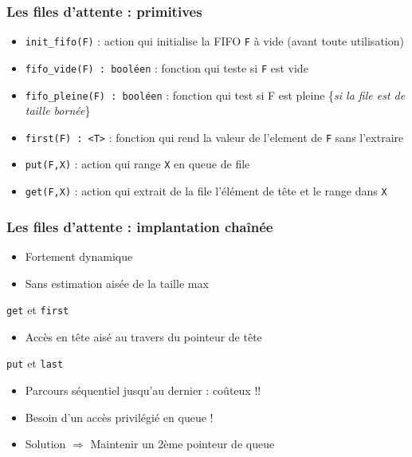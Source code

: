 \documentclass[table,handout,tikz,12pt,svgnames]{beamer}
\begin{document}
\begin{frame}[fragile=singleslide]
	\frametitle{Les files d'attente : primitives}
	\begin{block}{}
		\begin{itemize}
			\item \texttt{init\_fifo(F)} : action qui initialise la FIFO \texttt{F} à vide (avant toute utilisation)
			\item \texttt{fifo\_vide(F) : booléen} : fonction qui teste si \texttt{F} est vide
			\item \texttt{fifo\_pleine(F) : booléen} : fonction qui test si F est pleine \{\textit{si la file est de taille bornée}\}
			\item \texttt{first(F) : <T>} : fonction qui rend la valeur de l'element de \texttt{F} sans l'extraire
			\item \texttt{put(F,X)} : action qui range \texttt{X} en queue de file
			\item \texttt{get(F,X)} : action qui extrait de la file l'élément de tête et le range dans \texttt{X}
		\end{itemize}
	\end{block}
\end{frame}


\begin{frame}[fragile=singleslide]
	\frametitle{Les files d'attente : implantation chaînée}
	\begin{block}{}
		\begin{itemize}
			\item Fortement dynamique
			\item Sans estimation aisée de la taille max
		\end{itemize}
	\end{block}
	\begin{block}{\texttt{get} et \texttt{first}}
		\begin{itemize}
			\item Accès en tête aisé au travers du pointeur de tête
		\end{itemize}
	\end{block}
	\begin{block}{\texttt{put} et \texttt{last}}
		\begin{itemize}
			\item Parcours séquentiel jusqu'au dernier : coûteux !!
			\item Besoin d'un accès privilégié en queue !
			\item Solution $\Rightarrow$ Maintenir un 2ème pointeur de queue
		\end{itemize}
	\end{block}
\end{frame}
\end{document}
